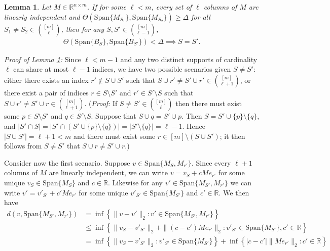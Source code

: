 \documentclass[journal,onecolumn]{IEEEtran}
\newtheorem{lemma}{Lemma}
\begin{document}
\begin{lemma}\label{GapInheritanceLemma}
Let $M \in \mathbb{R}^{n \times m}$. If for some $\ell < m$, every set of $\ell$ columns of $M$ are linearly independent and $\Theta(\text{Span}\{M_{S_1}\}, \text{Span}\{M_{S_2}\}) \geq \Delta$ for all $S_1 \neq S_2 \in {[m] \choose \ell}$, then for any $S, S' \in {[m] \choose \ell-1}$, 
\begin{align}
\Theta(\text{Span}\{B_S\}, \text{Span}\{B_{S'}\}) < \Delta \implies S = S'. 
\end{align}
\end{lemma}

\emph{Proof of Lemma \ref{GapInheritanceLemma}:} Since $\ell < m-1$ and any two distinct supports of cardinality $\ell$ can share at most $\ell-1$ indices, we have two possible scenarios given $S \neq S'$: either there exists an index $r' \notin S \cup S'$ such that $S \cup r' \neq S' \cup r' \in {[m] \choose \ell+1}$, or there exist a pair of indices $r \in S \setminus S'$ and $r' \in S' \setminus S$ such that $S \cup r' \neq S' \cup r \in {[m] \choose \ell+1}$. (\emph{Proof:} If $S \neq S' \in {[m] \choose \ell}$ then there must exist some $p \in S \setminus S'$ and $q \in S' \setminus S$. Suppose that $S \cup q = S' \cup p$. Then $S = S' \cup \{p\} \setminus \{q\}$, and $|S' \cap S| = |S' \cap (S' \cup \{p\} \setminus \{q\})| = |S' \setminus \{q\}| = \ell-1$. Hence $|S \cup S'| = \ell + 1 < m$ and there must exist some $r \in [m] \setminus (S \cup S')$; it then follows from $S \neq S'$ that $S \cup r \neq S' \cup r$.)

Consider now the first scenario. Suppose $v \in \text{Span}\{M_S, M_{r'}\}$. Since every $\ell + 1$ columns of $M$ are linearly independent, we can write $v = v_S + cMe_{r'}$ for some unique $v_S \in \text{Span}\{M_S\}$ and $c \in \mathbb{R}$. Likewise for any $v' \in \text{Span}\{M_{S'}, M_{r'}\}$ we can write $v' = v'_{S'} + c'Me_{r'}$ for some unique $v'_{S'}\in \text{Span}\{M_{S'}\}$ and $c' \in \mathbb{R}$. We then have
\begin{align*}
d(v,\text{Span}\{M_{S'}, M_{r'}\}) &= \inf \left\{ \|v - v' \|_2 : v' \in \text{Span}\{M_{S'}, M_{r'}\} \right\} \\
&\leq \inf \left\{ \|v_S - v'_{S'} \|_2 + \|(c-c')Me_{r'}\|_2: v'_{S'} \in \text{Span}\{M_{S'}\}, c' \in \mathbb{R} \right\} \\
&= \inf \left\{ \|v_S - v'_{S'} \|_2 : v'_{S'}\in \text{Span}\{M_{S'}\} \right\} + \inf \left\{ |c-c'| \|Me_{r'}\|_2 : c' \in \mathbb{R} \right\} \\
\end{align*}
\end{document}
